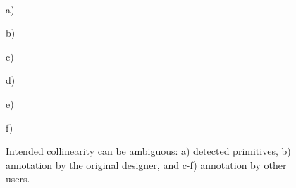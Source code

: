 \begin{figure}[t]
\vspace{-0.36in}
\\
\begin{minipage}{0.74in}\textcolor[rgb]{0,0,0}{\hspace{-0.01in} { a)}} \end{minipage}
\begin{minipage}{0.74in}\textcolor[rgb]{0,0,0}{\hspace{-0.01in} { b)}} \end{minipage}
\begin{minipage}{0.74in}\textcolor[rgb]{0,0,0}{\hspace{-0.01in} { c)}} \end{minipage}
\begin{minipage}{0.74in}\textcolor[rgb]{0,0,0}{\hspace{-0.01in} { d)}} \end{minipage}
\begin{minipage}{0.74in}\textcolor[rgb]{0,0,0}{\hspace{-0.01in} { e)}} \end{minipage}
\begin{minipage}{0.74in}\textcolor[rgb]{0,0,0}{\hspace{-0.01in} { f)}} \end{minipage}
\caption{Intended collinearity can be ambiguous: a) detected primitives, b)
  annotation by the original designer, and c-f) annotation by other users.}
\label{figure:colinearity}
\end{figure}
 
